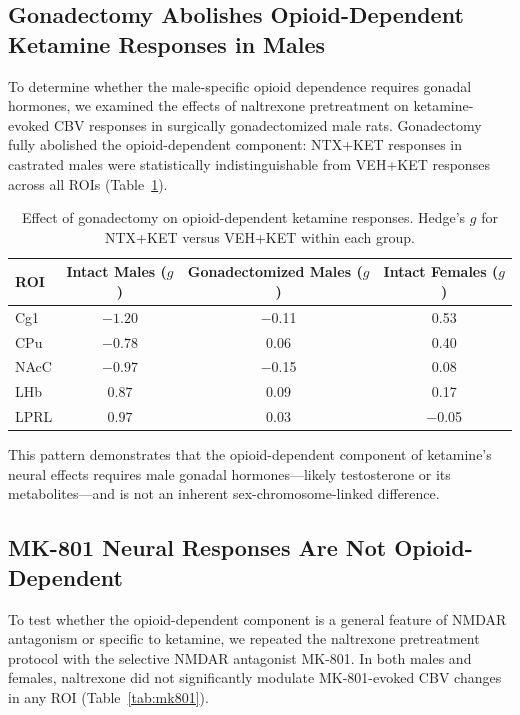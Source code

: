 \documentclass[11pt]{article}
\begin{document}
\subsection{Gonadectomy Abolishes Opioid-Dependent Ketamine Responses in Males}

To determine whether the male-specific opioid dependence requires gonadal hormones, we examined the effects of naltrexone pretreatment on ketamine-evoked CBV responses in surgically gonadectomized male rats. Gonadectomy fully abolished the opioid-dependent component: NTX+KET responses in castrated males were statistically indistinguishable from VEH+KET responses across all ROIs (Table~\ref{tab:gonadectomy}).

\begin{table}[H]
\centering
\caption{Effect of gonadectomy on opioid-dependent ketamine responses. Hedge's $g$ for NTX+KET versus VEH+KET within each group.}
\label{tab:gonadectomy}
\begin{tabular}{lccc}
\toprule
ROI & Intact Males ($g$) & Gonadectomized Males ($g$) & Intact Females ($g$) \\
\midrule
Cg1 & $\mathbf{-1.20}$ & $-$0.11 & 0.53 \\
CPu & $\mathbf{-0.78}$ & 0.06 & 0.40 \\
NAcC & $\mathbf{-0.97}$ & $-$0.15 & 0.08 \\
LHb & $\mathbf{0.87}$ & 0.09 & 0.17 \\
LPRL & $\mathbf{0.97}$ & 0.03 & $-$0.05 \\
\bottomrule
\end{tabular}
\end{table}

This pattern demonstrates that the opioid-dependent component of ketamine's neural effects requires male gonadal hormones---likely testosterone or its metabolites---and is not an inherent sex-chromosome-linked difference.

\subsection{MK-801 Neural Responses Are Not Opioid-Dependent}

To test whether the opioid-dependent component is a general feature of NMDAR antagonism or specific to ketamine, we repeated the naltrexone pretreatment protocol with the selective NMDAR antagonist MK-801. In both males and females, naltrexone did not significantly modulate MK-801-evoked CBV changes in any ROI (Table~\ref{tab:mk801}).
\end{document}
